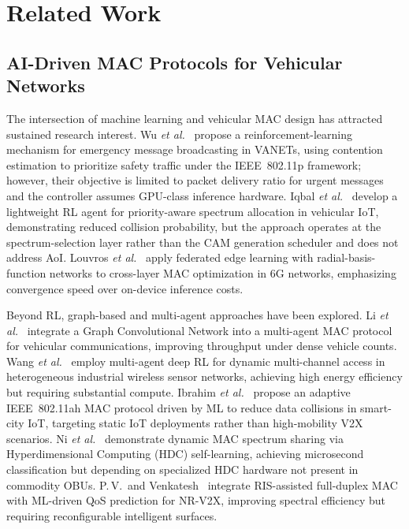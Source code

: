 \documentclass[journal]{IEEEtran}
\begin{document}
\section{Related Work}
\label{sec2}

\subsection{AI-Driven MAC Protocols for Vehicular Networks}
\label{subsec:ai_mac}

The intersection of machine learning and vehicular MAC design has
attracted sustained research interest.  Wu \emph{et al.}~\cite{Wu2025}
propose a reinforcement-learning mechanism for emergency message
broadcasting in VANETs, using contention estimation to prioritize
safety traffic under the IEEE~802.11p framework; however, their
objective is limited to packet delivery ratio for urgent messages and
the controller assumes GPU-class inference hardware.  Iqbal \emph{et
al.}~\cite{Iqbal2025} develop a lightweight RL agent for
priority-aware spectrum allocation in vehicular IoT, demonstrating
reduced collision probability, but the approach operates at the
spectrum-selection layer rather than the CAM generation scheduler and
does not address AoI.  Louvros \emph{et al.}~\cite{Louvros2026} apply
federated edge learning with radial-basis-function networks to
cross-layer MAC optimization in 6G networks, emphasizing convergence
speed over on-device inference costs.

Beyond RL, graph-based and multi-agent approaches have been explored.
Li \emph{et al.}~\cite{Li2024a} integrate a Graph Convolutional
Network into a multi-agent MAC protocol for vehicular communications,
improving throughput under dense vehicle counts.  Wang \emph{et
al.}~\cite{Wang2024} employ multi-agent deep RL for dynamic
multi-channel access in heterogeneous industrial wireless sensor
networks, achieving high energy efficiency but requiring substantial
compute.  Ibrahim \emph{et al.}~\cite{Ibrahim2025} propose an adaptive
IEEE~802.11ah MAC protocol driven by ML to reduce data collisions in
smart-city IoT, targeting static IoT deployments rather than
high-mobility V2X scenarios.  Ni \emph{et al.}~\cite{Ni2024}
demonstrate dynamic MAC spectrum sharing via Hyperdimensional
Computing (HDC) self-learning, achieving microsecond classification but
depending on specialized HDC hardware not present in commodity OBUs.
P.\,V.\ and Venkatesh~\cite{PV2025} integrate RIS-assisted full-duplex
MAC with ML-driven QoS prediction for NR-V2X, improving spectral
efficiency but requiring reconfigurable intelligent surfaces.
\end{document}
